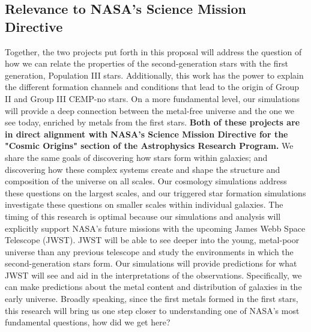 \documentclass[letterpaper, 12pt]{article}
\begin{document}
\subsection*{Relevance to NASA's Science Mission Directive}
Together, the two projects put forth in this proposal will address the question of how we can relate the properties of the second-generation stars with the first generation, Population III stars. Additionally, this work has the power to explain the different formation channels and conditions that lead to the origin of Group II and Group III CEMP-no stars. On a more fundamental level, our simulations will provide a deep connection between the metal-free universe and the one we see today, enriched by metals from the first stars. \textbf{Both of these projects are in direct alignment with NASA's Science Mission Directive for the "Cosmic Origins" section of the Astrophysics Research Program.} We share the same goals of discovering how stars form within galaxies; and discovering how these complex systems create and shape the structure and composition of the universe on all scales. Our cosmology simulations address these questions on the largest scales, and our triggered star formation simulations investigate these questions on smaller scales within individual galaxies. The timing of this research is optimal because our simulations and analysis will explicitly support NASA's future missions with the upcoming James Webb Space Telescope (JWST). JWST will be able to see deeper into the young, metal-poor universe than any previous telescope and study the environments in which the second-generation stars form. Our simulations will provide predictions for what JWST will see and aid in the interpretations of the observations. Specifically, we can make predictions about the metal content and distribution of galaxies in the early universe. Broadly speaking, since the first metals formed in the first stars, this research will bring us one step closer to understanding one of NASA's most fundamental questions, how did we get here?


\end{document}
